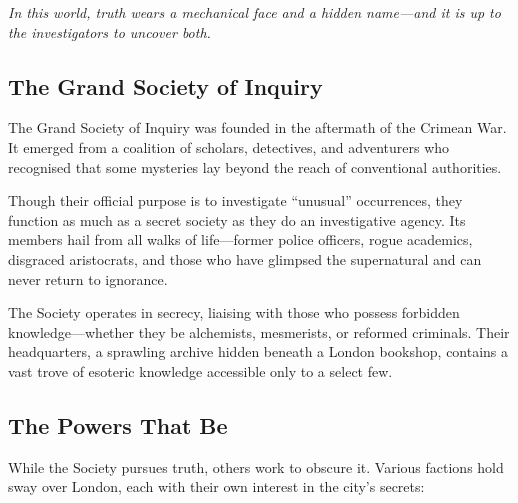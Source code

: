\textit{In this world, truth wears a mechanical face and a hidden name—and it is up to the investigators to uncover both.}

\subsection{The Grand Society of Inquiry}

The Grand Society of Inquiry was founded in the aftermath of the Crimean War. It emerged from a coalition of scholars, detectives, and adventurers who recognised that some mysteries lay beyond the reach of conventional authorities.

Though their official purpose is to investigate “unusual” occurrences, they function as much as a secret society as they do an investigative agency. Its members hail from all walks of life—former police officers, rogue academics, disgraced aristocrats, and those who have glimpsed the supernatural and can never return to ignorance.

The Society operates in secrecy, liaising with those who possess forbidden knowledge—whether they be alchemists, mesmerists, or reformed criminals. Their headquarters, a sprawling archive hidden beneath a London bookshop, contains a vast trove of esoteric knowledge accessible only to a select few.

\subsection{The Powers That Be}

While the Society pursues truth, others work to obscure it. Various factions hold sway over London, each with their own interest in the city’s secrets:

